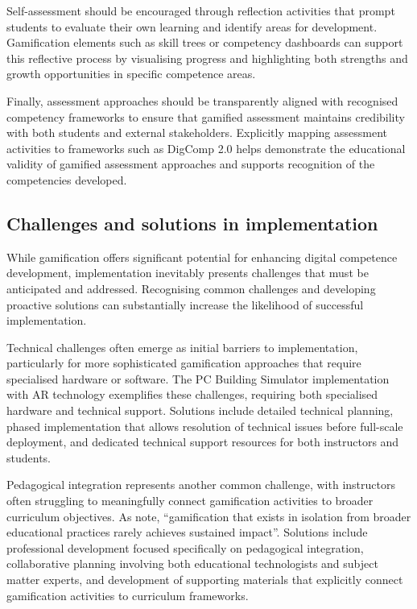 \documentclass[cte]{acnsart}
\begin{document}
Self-assessment should be encouraged through reflection activities that prompt students to evaluate their own learning and identify areas for development. Gamification elements such as skill trees or competency dashboards can support this reflective process by visualising progress and highlighting both strengths and growth opportunities in specific competence areas.

Finally, assessment approaches should be transparently aligned with recognised competency frameworks to ensure that gamified assessment maintains credibility with both students and external stakeholders. Explicitly mapping assessment activities to frameworks such as DigComp 2.0 helps demonstrate the educational validity of gamified assessment approaches and supports recognition of the competencies developed.

\subsection{Challenges and solutions in implementation}

While gamification offers significant potential for enhancing digital competence development, implementation inevitably presents challenges that must be anticipated and addressed. Recognising common challenges and developing proactive solutions can substantially increase the likelihood of successful implementation.

Technical challenges often emerge as initial barriers to implementation, particularly for more sophisticated gamification approaches that require specialised hardware or software. The PC Building Simulator implementation with AR technology exemplifies these challenges, requiring both specialised hardware and technical support. Solutions include detailed technical planning, phased implementation that allows resolution of technical issues before full-scale deployment, and dedicated technical support resources for both instructors and students.

Pedagogical integration represents another common challenge, with instructors often struggling to meaningfully connect gamification activities to broader curriculum objectives. As \citet{Figg20181215} note, ``gamification that exists in isolation from broader educational practices rarely achieves sustained impact''. Solutions include professional development focused specifically on pedagogical integration, collaborative planning involving both educational technologists and subject matter experts, and development of supporting materials that explicitly connect gamification activities to curriculum frameworks.
\end{document}
